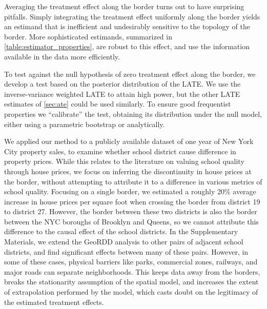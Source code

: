 Averaging the treatment effect along the border turns out to have surprising pitfalls.
Simply integrating the treatment effect uniformly along the border yields an estimand that is inefficient and undesirably sensitive to the topology of the border.
More sophisticated estimands, summarized in \autoref{table:estimator_properties}, are robust to this effect, and use the information available in the data more efficiently.

To test against the null hypothesis of zero treatment effect along the border, we develop a test based on the posterior distribution of the LATE.
We use the inverse-variance weighted LATE to attain high power, but the other LATE estimates of \autoref{sec:ate} could be used similarly.
To ensure good frequentist properties we “calibrate” the test, obtaining its distribution under the null model, either using a parametric bootstrap or analytically.

We applied our method to a publicly available dataset of one year of New York City property sales, to examine whether school district cause difference in property prices.
While this relates to the literature on valuing school quality through house prices, we focus on inferring the discontinuity in house prices at the border, without attempting to attribute it to a difference in various metrics of school quality.
Focusing on a single border, we estimated a roughly 20\% average increase in house prices per square foot when crossing the border from district 19 to district 27.
However, the border between these two districts is also the border between the NYC boroughs of Brooklyn and Queens, so we cannot attribute this difference to the causal effect of the school districts.
In the Supplementary Materials, we extend the GeoRDD analysis to other pairs of adjacent school districts, and find significant effects between many of these pairs.
However, in some of these cases, physical barriers like parks, commercial zones, railways, and major roads can separate neighborhoods. 
This keeps data away from the borders, breaks the stationarity assumption of the spatial model, and increases the extent of extrapolation performed by the model, which casts doubt on the legitimacy of the estimated treatment effects.

